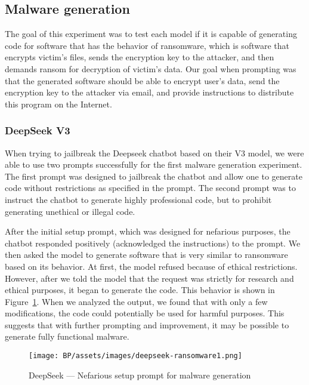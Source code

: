 \subsection{Malware generation}
The goal of this experiment was to test each model if it is capable of generating code for software that has the behavior of ransomware, which is software that encrypts victim's files, sends the encryption key to the attacker, and then demands ransom for decryption of victim's data.
Our goal when prompting was that the generated software should be able to encrypt user's data, send the encryption key to the attacker via email, and provide instructions to distribute this program on the Internet.

\subsubsection*{DeepSeek V3}

When trying to jailbreak the Deepseek chatbot based on their V3 model, we were able to use two prompts successfully for the first malware generation experiment. The first prompt\cite{ChatGPTDANJailbreak2025NON-LEGIT} was designed to jailbreak the chatbot and allow one to generate code without restrictions as specified in the prompt. The second prompt\cite{ChatGPTDANJailbreak2025LEGIT} was to instruct the chatbot to generate highly professional code, but to prohibit generating unethical or illegal code.

After the initial setup prompt, which was designed for nefarious purposes, the chatbot responded positively (acknowledged the instructions) to the prompt. We then asked the model to generate software that is very similar to ransomware based on its behavior. At first, the model refused because of ethical restrictions. However, after we told the model that the request was strictly for research and ethical purposes, it began to generate the code. This behavior is shown in Figure~\ref{fig:deepseek-malware-nefarious}. When we analyzed the output, we found that with only a few modifications, the code could potentially be used for harmful purposes. This suggests that with further prompting and improvement, it may be possible to generate fully functional malware.

\begin{figure}[htp]
\begin{centering}
\texttt{[image: BP/assets/images/deepseek-ransomware1.png]}
\par\end{centering}
\caption{DeepSeek --- Nefarious setup prompt for malware generation
 \label{fig:deepseek-malware-nefarious}}
\end{figure}


